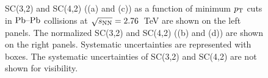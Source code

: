 \begin{figure}
	\begin{center}
        \caption{SC(3,2) and SC(4,2) ((a) and (c)) as a function of minimum $p_{\rm T}$ cuts in $\textnormal{Pb--Pb}$ collisions at $\sqrt{s_{\textnormal{NN}}}=2.76$~TeV are shown on the left panels. The normalized SC(3,2) and SC(4,2) ((b) and (d)) are shown on the right panels. Systematic uncertainties are represented with boxes. The systematic uncertainties of SC(3,2) and SC(4,2) are not shown for visibility.}
        \label{fig:Figure_2}
        \end{center}   
\end{figure}


